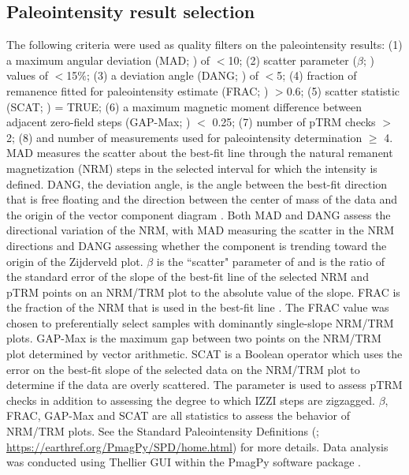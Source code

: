 \subsection*{Paleointensity result selection}
The following criteria were used as quality filters on the paleointensity results: (1) a maximum angular deviation (MAD;  \citealp{Kirschvink1980a}) of $<$10\textdegree; (2) scatter parameter ($\beta$;  \citealp{Coe1978a}) values of $<$15$\%$; (3) a deviation angle (DANG;  \citealp{Tauxe2004a}) of $<$5\textdegree; (4) fraction of remanence fitted for paleointensity estimate (FRAC;  \citep{Shaar2013a}) $>$0.6; (5) scatter statistic (SCAT;  \citealp{Shaar2013a}) = TRUE; (6) a maximum magnetic moment difference between adjacent zero-field steps (GAP-Max;  \citealp{Shaar2013a}) $<$ 0.25; (7) number of pTRM checks $>$ 2; (8) and number of measurements used for paleointensity determination $\geq$ 4. MAD measures the scatter about the best-fit line through the natural remanent magnetization (NRM) steps in the selected interval for which the intensity is defined. DANG, the deviation angle, is the angle between the best-fit direction that is free floating and the direction between the center of mass of the data and the origin of the vector component diagram \citep{Tauxe2004a}. Both MAD and DANG assess the directional variation of the NRM, with MAD measuring the scatter in the NRM directions and DANG assessing whether the component is trending toward the origin of the Zijderveld plot. $\beta$ is the ``scatter" parameter of  \citep{Coe1978a} and is the ratio of the standard error of the slope of the best-fit line of the selected NRM and pTRM points on an NRM/TRM plot to the absolute value of the slope. FRAC is the fraction of the NRM that is used in the best-fit line \citep{Shaar2013a}. The FRAC value was chosen to preferentially select samples with dominantly single-slope NRM/TRM plots. GAP-Max is the maximum gap between two points on the NRM/TRM plot determined by vector arithmetic. SCAT is a Boolean operator which uses the error on the best-fit slope of the selected data on the NRM/TRM plot to determine if the data are overly scattered. The parameter is used to assess pTRM checks in addition to assessing the degree to which IZZI steps are zigzagged. $\beta$, FRAC, GAP-Max and SCAT are all statistics to assess the behavior of NRM/TRM plots. See the Standard Paleointensity Definitions (\citealp{Paterson2014a}; \url{https://earthref.org/PmagPy/SPD/home.html}) for more details. Data analysis was conducted using Thellier GUI \citep{Shaar2013a} within the PmagPy software package \citep{Tauxe2016a}.

